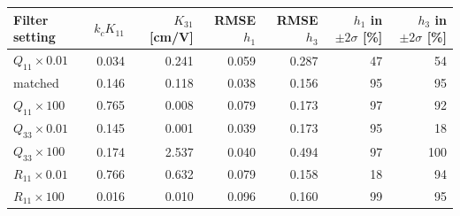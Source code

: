 \begin{tabular}{lrrrrrr}
\toprule
Filter setting & $k_cK_{11}$ & $K_{31}$ [cm/V] & RMSE $h_1$ & RMSE $h_3$ & $h_1$ in $\pm2\sigma$ [\%] & $h_3$ in $\pm2\sigma$ [\%] \\
\midrule
$Q_{11}\times0.01$ & 0.034 & 0.241 & 0.059 & 0.287 & 47 & 54 \\
matched & 0.146 & 0.118 & 0.038 & 0.156 & 95 & 95 \\
$Q_{11}\times100$ & 0.765 & 0.008 & 0.079 & 0.173 & 97 & 92 \\
$Q_{33}\times0.01$ & 0.145 & 0.001 & 0.039 & 0.173 & 95 & 18 \\
$Q_{33}\times100$ & 0.174 & 2.537 & 0.040 & 0.494 & 97 & 100 \\
$R_{11}\times0.01$ & 0.766 & 0.632 & 0.079 & 0.158 & 18 & 94 \\
$R_{11}\times100$ & 0.016 & 0.010 & 0.096 & 0.160 & 99 & 95 \\
\bottomrule
\end{tabular}
